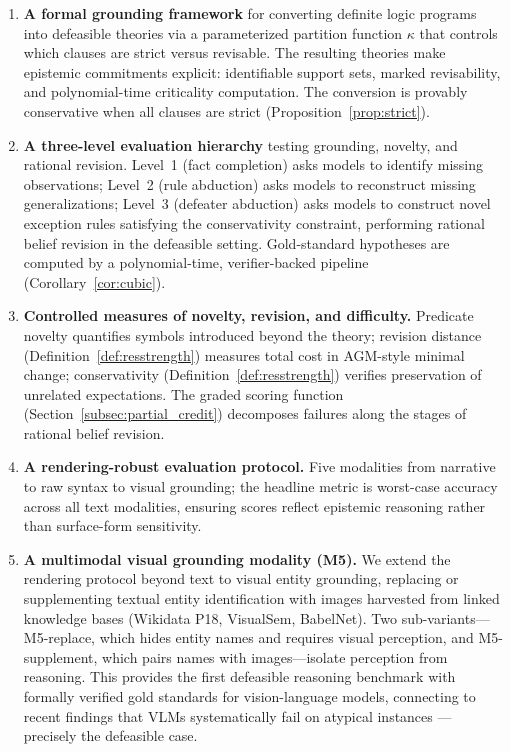 \documentclass{article}
\theoremstyle{definition}
\begin{document}
\begin{enumerate}[label=(\arabic*),nosep]
    \item \textbf{A formal grounding framework} for converting definite logic programs into defeasible theories via a parameterized partition function $\kappa$ that controls which clauses are strict versus revisable. The resulting theories make epistemic commitments explicit: identifiable support sets, marked revisability, and polynomial-time criticality computation. The conversion is provably conservative when all clauses are strict (Proposition~\ref{prop:strict}).

    \item \textbf{A three-level evaluation hierarchy} testing grounding, novelty, and rational revision. Level~1 (fact completion) asks models to identify missing observations; Level~2 (rule abduction) asks models to reconstruct missing generalizations; Level~3 (defeater abduction) asks models to construct novel exception rules satisfying the conservativity constraint, performing rational belief revision in the defeasible setting. Gold-standard hypotheses are computed by a polynomial-time, verifier-backed pipeline (Corollary~\ref{cor:cubic}).

    \item \textbf{Controlled measures of novelty, revision, and difficulty.} Predicate novelty quantifies symbols introduced beyond the theory; revision distance (Definition~\ref{def:resstrength}) measures total cost in AGM-style minimal change; conservativity (Definition~\ref{def:resstrength}) verifies preservation of unrelated expectations. The graded scoring function (Section~\ref{subsec:partial_credit}) decomposes failures along the stages of rational belief revision.

    \item \textbf{A rendering-robust evaluation protocol.} Five modalities from narrative to raw syntax to visual grounding; the headline metric is worst-case accuracy across all text modalities, ensuring scores reflect epistemic reasoning rather than surface-form sensitivity.

    \item \textbf{A multimodal visual grounding modality (M5).} We extend the rendering protocol beyond text to visual entity grounding, replacing or supplementing textual entity identification with images harvested from linked knowledge bases (Wikidata P18, VisualSem, BabelNet). Two sub-variants---M5-replace, which hides entity names and requires visual perception, and M5-supplement, which pairs names with images---isolate perception from reasoning. This provides the first defeasible reasoning benchmark with formally verified gold standards for vision-language models, connecting to recent findings that VLMs systematically fail on atypical instances \cite{park2025visage}---precisely the defeasible case.


\end{enumerate}
\end{document}
